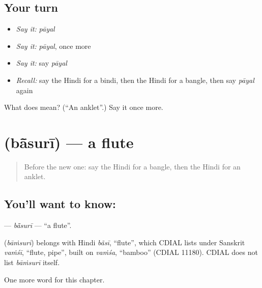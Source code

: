 \subsection*{Your turn}
\begin{itemize}
\raggedright
  \item \emph{Say it:} \emph{pāyal}
  \item \emph{Say it:} \emph{pāyal}, once more
  \item \emph{Say it:} say \emph{pāyal}
  \item \emph{Recall:} say the Hindi for a bindi, then the Hindi for a bangle, then say \emph{pāyal} again
\end{itemize}

\begin{tcolorbox}[breakable,colback=teal!4,colframe=teal!35!black,title={Before you move on}]
What does  mean? (\textquotedblleft{}An anklet\textquotedblright{}.) Say it once more.
\end{tcolorbox}
\section[\texorpdfstring{\hi{बाँसुरी} (bā̃surī)}{बाँसुरी (bā̃surī)}]{ (bā̃surī) — a flute}

\label{lesson:HI-C263-basuri}



\begin{quote}
Before the new one: say the Hindi for a bangle, then the Hindi for an anklet.
\end{quote}

\subsection*{You'll want to know: }
\textbf{} — \emph{bā̃surī} — \textquotedblleft{}a flute\textquotedblright{}.

\begin{cousinweb}
\textbf{} (\emph{bāṁsurī}) belongs with Hindi \emph{bãsī}, \textquotedblleft{}flute\textquotedblright{}, which CDIAL lists under Sanskrit \emph{vaṁśī}, \textquotedblleft{}flute, pipe\textquotedblright{}, built on \emph{vaṁśa}, \textquotedblleft{}bamboo\textquotedblright{} (CDIAL 11180). CDIAL does not list \emph{bāṁsurī} itself.
\end{cousinweb}

\begin{grammarlens}[title={What you've built}]
One more word for this chapter.
\end{grammarlens}

